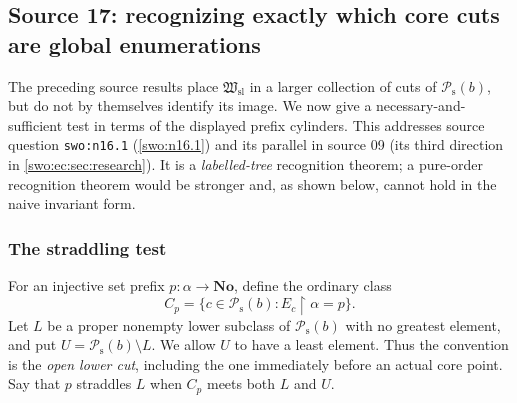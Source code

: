 \documentclass[11pt]{article}
\theoremstyle{definition}
\theoremstyle{remark}
\newcommand{\No}{\mathbf{No}}
\newcommand{\Hsl}{\mathfrak W_{\mathrm{sl}}}
\newcommand{\Psupp}{\mathcal P_{\mathrm{s}}}
\newcommand{\res}{\mathbin{\upharpoonright}}
\newcommand{\code}[1]{\texttt{\small #1}}
\begin{document}
\subsection{Source 17: recognizing exactly which core cuts are global enumerations}
\label{swo:gs:sec:recognition}

The preceding source results place $\Hsl$ in a larger collection of cuts
of $\Psupp(b)$, but do not by themselves identify its image. We now give a
necessary-and-sufficient test in terms of the displayed prefix cylinders.
This addresses source question \code{swo:n16.1} (\cref{swo:n16.1}) and its parallel in
source 09 (its third direction in \cref{swo:ec:sec:research}). It is a \emph{labelled-tree} recognition theorem; a pure-order
recognition theorem would be stronger and, as shown below, cannot hold in
the naive invariant form.

\subsubsection{The straddling test}
For an injective set prefix $p:\alpha\to\No$, define the ordinary class
\[
 C_p=\{c\in \Psupp(b):E_c\res\alpha=p\}.
\]
Let $L$ be a proper nonempty lower subclass of $\Psupp(b)$ with no greatest
element, and put $U=\Psupp(b)\setminus L$. We allow $U$ to have a least
element. Thus the convention is the \emph{open lower cut}, including the
one immediately before an actual core point. Say that $p$ straddles $L$
when $C_p$ meets both $L$ and $U$.
\end{document}
